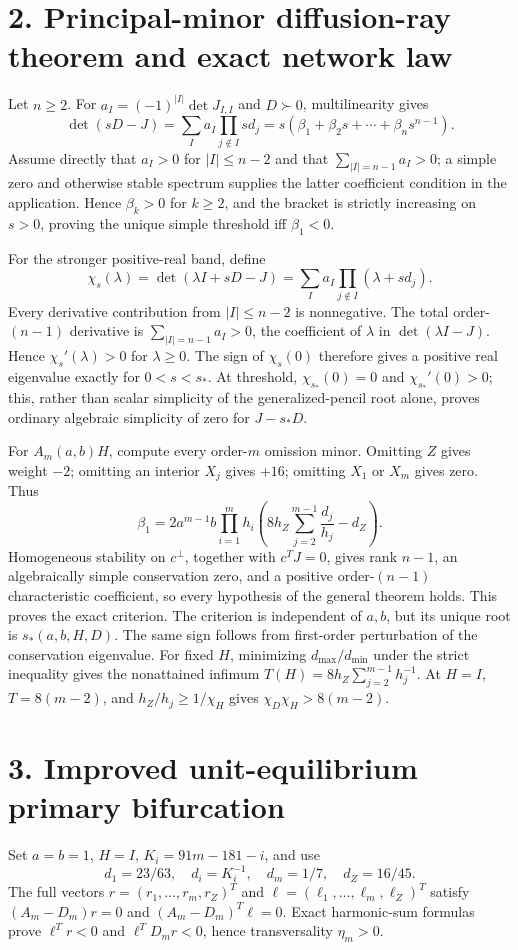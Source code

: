 \documentclass[10pt]{article}
\begin{document}
\newpage
\section*{2. Principal-minor diffusion-ray theorem and exact network law}
Let $n\ge2$.  For $a_I=(-1)^{|I|}\det J_{I,I}$ and $D\succ0$,
multilinearity gives
\[
\det(sD-J)=\sum_Ia_I\prod_{j\notin I}sd_j
=s(\beta_1+\beta_2s+\cdots+\beta_ns^{n-1}).
\]
Assume directly that $a_I>0$ for $|I|\le n-2$ and that
$\sum_{|I|=n-1}a_I>0$; a simple zero and otherwise stable spectrum supplies
the latter coefficient condition in the application.  Hence $\beta_k>0$
for $k\ge2$, and the bracket is strictly increasing on $s>0$, proving the
unique simple threshold iff $\beta_1<0$.

For the stronger positive-real band, define
\[
\chi_s(\lambda)=\det(\lambda I+sD-J)
=\sum_Ia_I\prod_{j\notin I}(\lambda+sd_j).
\]
Every derivative contribution from $|I|\le n-2$ is nonnegative. The total
order-$(n-1)$ derivative is $\sum_{|I|=n-1}a_I>0$, the coefficient of
$\lambda$ in $\det(\lambda I-J)$. Hence $\chi_s'(\lambda)>0$ for $\lambda\ge0$. The sign of $\chi_s(0)$ therefore gives a positive real eigenvalue exactly for $0<s<s_*$.
At threshold, $\chi_{s_*}(0)=0$ and $\chi_{s_*}'(0)>0$; this, rather than
scalar simplicity of the generalized-pencil root alone, proves ordinary
algebraic simplicity of zero for $J-s_*D$.

For $A_m(a,b)H$, compute every order-$m$ omission minor. Omitting $Z$ gives weight $-2$; omitting an interior $X_j$ gives $+16$; omitting $X_1$ or $X_m$ gives zero. Thus
\[
\beta_1=2a^{m-1}b\prod_{i=1}^mh_i
\left(8h_Z\sum_{j=2}^{m-1}\frac{d_j}{h_j}-d_Z\right).
\]
Homogeneous stability on $c^\perp$, together with $c^TJ=0$, gives rank
$n-1$, an algebraically simple conservation zero, and a positive
order-$(n-1)$ characteristic coefficient, so every hypothesis of the general
theorem holds.  This proves the exact criterion.  The criterion is independent
of $a,b$, but its unique root is $s_*(a,b,H,D)$.  The same sign follows from
first-order perturbation of the conservation eigenvalue. For fixed $H$,
minimizing $d_{\max}/d_{\min}$ under the strict inequality gives the
nonattained infimum $T(H)=8h_Z\sum_{j=2}^{m-1} h_j^{-1}$. At $H=I$,
$T=8(m-2)$, and $h_Z/h_j\ge1/\chi_H$ gives
$\chi_D\chi_H>8(m-2)$.

\newpage
\section*{3. Improved unit-equilibrium primary bifurcation}
Set $a=b=1$, $H=I$, $K_i=91m-181-i$, and use
\[
d_1=23/63,\quad d_i=K_i^{-1},\quad d_m=1/7,\quad d_Z=16/45.
\]
The full vectors $r=(r_1,\ldots,r_m,r_Z)^T$ and
$\ell=(\ell_1,\ldots,\ell_m,\ell_Z)^T$ satisfy
$(A_m-D_m)r=0$ and $(A_m-D_m)^T\ell=0$. Exact harmonic-sum formulas prove $\ell^Tr<0$ and $\ell^TD_mr<0$, hence transversality $\eta_m>0$.
\end{document}
